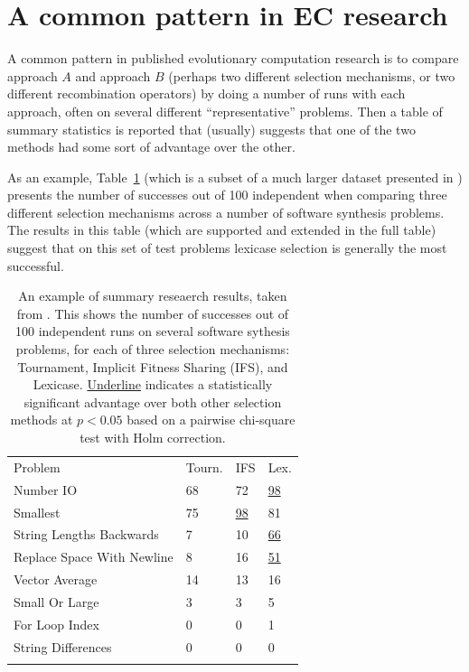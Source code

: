 \section{A common pattern in EC research}
\label{sec:EC_pattern}

A common pattern in published evolutionary computation research is to
compare approach $A$ and approach $B$ (perhaps two different selection
mechanisms, or two different recombination operators) by doing a number
of runs with each approach, often on several different ``representative''
problems. Then a table of summary statistics is reported that (usually)
suggests that one of the two methods had some sort of advantage over
the other.

As an example, Table~\ref{tab:example_table} (which is a subset of a 
much larger dataset presented in \cite{Helmuth:Benchmarks}) presents
the number of successes out of 100 independent when comparing three
different selection mechanisms across a number of software synthesis
problems. The results in this table (which are supported and extended
in the full table) suggest that on this set of test problems lexicase
selection is generally the most successful.

\begin{table}
	\caption{An example of summary reseaerch results, taken from
	\cite{Helmuth:Benchmarks}. This shows the number of successes
    out of 100 independent runs on several software sythesis problems,
    for each of three selection mechanisms: Tournament, Implicit Fitness Sharing (IFS), and Lexicase. \underline{Underline} indicates a statistically
    significant advantage over both other selection methods at $p < 0.05$
    based on a pairwise chi-square test with Holm correction.}
	\label{tab:example_table}       %
	\begin{tabular}{llll}
		\hline\noalign{\smallskip}
		Problem & Tourn. & IFS & Lex. \\
		\noalign{\smallskip}\hline\noalign{\smallskip}
		Number IO & 68 & 72 & \underline{98} \\
		Smallest & 75 & \underline{98} & 81 \\
		String Lengths Backwards & 7 & 10 & \underline{66} \\
		Replace Space With Newline & 8 & 16 & \underline{51} \\
		Vector Average & 14 & 13 & 16 \\
		Small Or Large & 3 & 3 & 5 \\
		For Loop Index & 0 & 0 & 1 \\
		String Differences & 0 & 0 & 0 \\
		\noalign{\smallskip}\hline
	\end{tabular}
\end{table}

